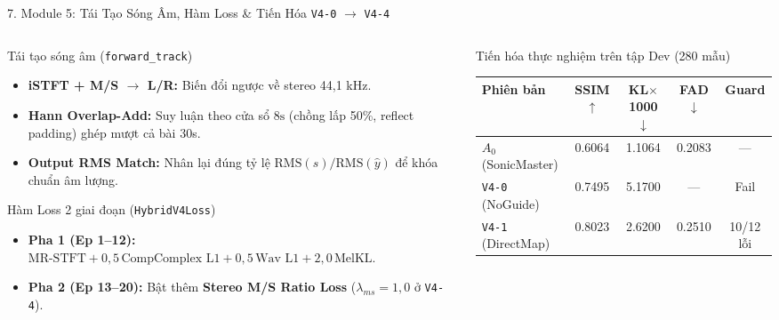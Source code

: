 \documentclass[aspectratio=169,10pt]{beamer}
\begin{document}
\begin{frame}{7. Module 5: Tái Tạo Sóng Âm, Hàm Loss \& Tiến Hóa \texttt{V4-0} $\rightarrow$ \texttt{V4-4}}
  \begin{columns}[T]
    \begin{column}{0.45\textwidth}
      \scriptsize
      \begin{block}{Tái tạo sóng âm (\texttt{forward\_track})}
        \begin{itemize}
          \item \textbf{iSTFT + M/S $\rightarrow$ L/R:} Biến đổi ngược về stereo 44,1 kHz.
          \item \textbf{Hann Overlap-Add:} Suy luận theo cửa sổ $8\text{s}$ (chồng lấp 50\%, reflect padding) ghép mượt cả bài 30s.
          \item \textbf{Output RMS Match:} Nhân lại đúng tỷ lệ $\text{RMS}(s)/\text{RMS}(\hat{y})$ để khóa chuẩn âm lượng.
        \end{itemize}
      \end{block}
      \begin{block}{Hàm Loss 2 giai đoạn (\texttt{HybridV4Loss})}
        \begin{itemize}
          \item \textbf{Pha 1 (Ep 1--12):} $\text{MR-STFT} + 0{,}5\,\text{CompComplex L1} + 0{,}5\,\text{Wav L1} + 2{,}0\,\text{MelKL}$.
          \item \textbf{Pha 2 (Ep 13--20):} Bật thêm \textbf{Stereo M/S Ratio Loss} ($\lambda_{ms}=1{,}0$ ở \texttt{V4-4}).
        \end{itemize}
      \end{block}
    \end{column}
    \begin{column}{0.52\textwidth}
      \scriptsize
      \begin{block}{Tiến hóa thực nghiệm trên tập Dev (280 mẫu)}
        \centering
        \begin{tabular}{lcccc}
          \toprule
          \textbf{Phiên bản} & \textbf{SSIM} $\uparrow$ & \textbf{KL$\times$1000} $\downarrow$ & \textbf{FAD} $\downarrow$ & \textbf{Guard} \\
          \midrule
          $A_0$ (SonicMaster) & 0.6064 & 1.1064 & 0.2083 & --- \\
          \texttt{V4-0} (NoGuide) & 0.7495 & 5.1700 & --- & Fail \\
          \texttt{V4-1} (DirectMap) & 0.8023 & 2.6200 & 0.2510 & 10/12 lỗi \\

\end{tabular}
\end{block}
\end{column}
\end{columns}
\end{frame}
\end{document}

